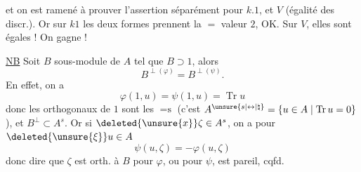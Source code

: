 et  on est ramené à prouver l'assertion  séparément pour $k.1$, et $V$ (égalité des discr.). Or sur $k1$ les deux formes   prennent la $=$ valeur $2$, OK. Sur $V$,  elles sont égales ! On gagne !


\uline{NB} Soit $B$ sous-module de $A$ tel que $B\supset1$, alors
\[
B^{\perp(\varphi)}=B^{\perp(\psi)}.
\]
En effet,   on a
\[
\varphi(1,u)=\psi(1,u)=\operatorname{Tr}u
\]
donc les orthogonaux de $1$ sont les $=\text{s}$ (c'est $A^{\unsure{s|\leftrightarrow|\natural}}=\{u\in A\mid\operatorname{Tr}u=0\}$), et $B^\perp\subset A^s$. Or si $\deleted{\unsure{x}}\zeta\in A^s$, on a pour   $\deleted{\unsure{\xi}}u\in A$
\[
\psi(u,\zeta)=-\varphi(u,\zeta)
\]
donc dire que $\zeta$ est orth. à $B$ pour $\varphi$, ou pour $\psi$, est pareil, cqfd.
